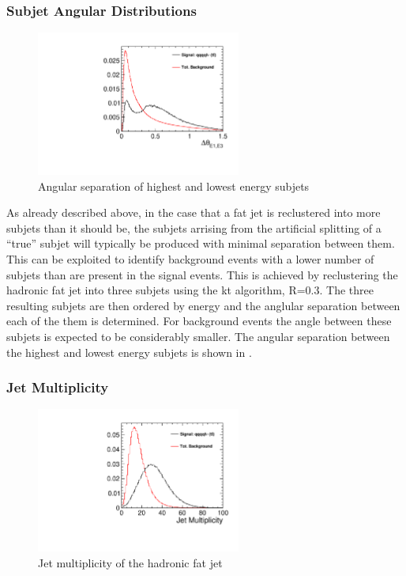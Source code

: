 \subsubsection{Subjet Angular Distributions}
\begin{figure}
  \centering
  \includegraphics[width=0.6\textwidth]{TopAnalysis/figures/HighELowEDira.pdf}
  \caption[Angular separation of highest and lowest energy subjets]{Angular separation of highest and lowest energy subjets}
  \label{fig:angularrelations}
\end{figure}


As already described above, in the case that a fat jet is reclustered into more subjets than it should be, the subjets arrising from the artificial splitting of a ``true'' subjet will typically be produced with minimal separation between them. This can be exploited to identify background events with a lower number of subjets than are present in the signal events. This is achieved by reclustering the hadronic fat jet into three subjets using the kt algorithm, R=0.3. The three resulting subjets are then ordered by energy and the anglular separation between each of the them is determined. For background events the angle between these subjets is expected to be considerably smaller. The angular separation between the highest and lowest energy subjets is shown in .



\subsubsection{Jet Multiplicity}
\label{Jet Multiplicity}

\begin{figure}
  \centering
  \includegraphics[width=0.6\textwidth]{TopAnalysis/figures/JetMultiplicity.pdf}
  \caption[Jet multiplicity of the hadronic fat jet]{Jet multiplicity of the hadronic fat jet}
  \label{fig:multiplicity}
\end{figure}


